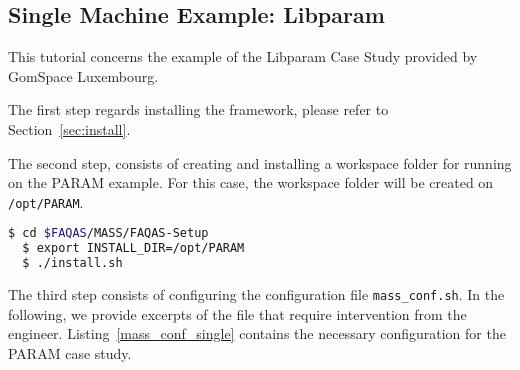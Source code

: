 
\subsection{Single Machine Example: Libparam}
\label{sec:single_machine_libparam}

This tutorial concerns the example of the Libparam Case Study provided by GomSpace Luxembourg.

The first step regards installing the \MASS framework, please refer to Section~\ref{sec:install}.

The second step, consists of creating and installing a workspace folder for running \MASS on the PARAM example. For this case, the workspace folder will be created on \texttt{/opt/PARAM}.

\begin{lstlisting}[language=bash]
  $ cd $FAQAS/MASS/FAQAS-Setup
  $ export INSTALL_DIR=/opt/PARAM
  $ ./install.sh
\end{lstlisting}

The third step consists of configuring the \MASS configuration file \texttt{mass\_conf.sh}. In the following, we provide excerpts of the file that require intervention from the engineer. Listing~\ref{mass_conf_single} contains the necessary configuration for the PARAM case study.

